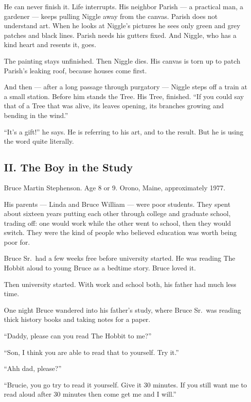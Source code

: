 He can never finish it. Life interrupts. His neighbor Parish --- a practical man, a gardener --- keeps pulling Niggle away from the canvas. Parish does not understand art. When he looks at Niggle's pictures he sees only green and grey patches and black lines. Parish needs his gutters fixed. And Niggle, who has a kind heart and resents it, goes.

The painting stays unfinished. Then Niggle dies. His canvas is torn up to patch Parish's leaking roof, because houses come first.

And then --- after a long passage through purgatory --- Niggle steps off a train at a small station. Before him stands the Tree. His Tree, finished. ``If you could say that of a Tree that was alive, its leaves opening, its branches growing and bending in the wind.''

``It's a gift!'' he says. He is referring to his art, and to the result. But he is using the word quite literally.


\subsection*{II. The Boy in the Study}
\label{pos36:the-boy-in-the-study}

Bruce Martin Stephenson. Age 8 or 9. Orono, Maine, approximately 1977.

His parents --- Linda and Bruce William --- were poor students. They spent about sixteen years putting each other through college and graduate school, trading off: one would work while the other went to school, then they would switch. They were the kind of people who believed education was worth being poor for.

Bruce Sr.\ had a few weeks free before university started. He was reading The Hobbit aloud to young Bruce as a bedtime story. Bruce loved it.

Then university started. With work and school both, his father had much less time.

One night Bruce wandered into his father's study, where Bruce Sr.\ was reading thick history books and taking notes for a paper.

``Daddy, please can you read The Hobbit to me?''

``Son, I think you are able to read that to yourself. Try it.''

``Ahh dad, please?''

``Brucie, you go try to read it yourself. Give it 30 minutes. If you still want me to read aloud after 30 minutes then come get me and I will.''


